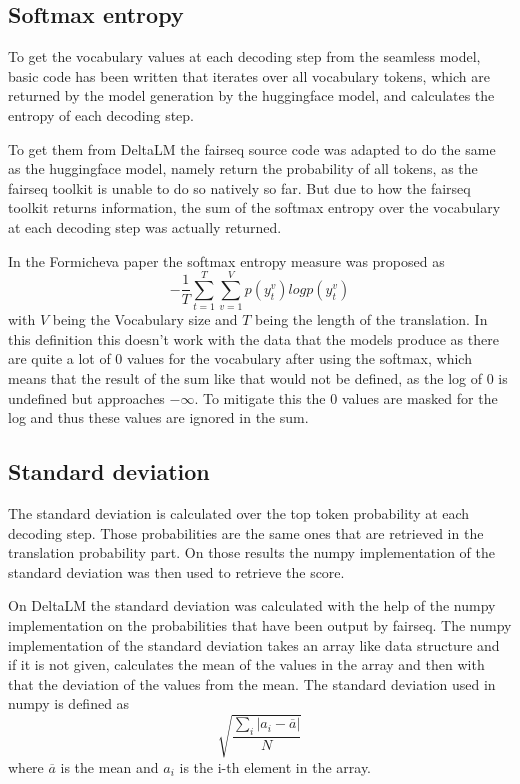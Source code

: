 \subsection{Softmax entropy}
To get the vocabulary values at each decoding step from the seamless model, basic code has been written that iterates over all vocabulary tokens, which are returned by the model generation by the huggingface model, and calculates the entropy of each decoding step.

To get them from DeltaLM the fairseq source code was adapted to do the same as the huggingface model, namely return the probability of all tokens, as the fairseq toolkit is unable to do so natively so far.
But due to how the fairseq toolkit returns information, the sum of the softmax entropy over the vocabulary at each decoding step was actually returned. 

In the Formicheva \cite{fomicheva2020unsupervised} paper the softmax entropy measure was proposed as $$-\frac{1}{T}\sum_{t=1}^T\sum_{v=1}^Vp(y_t^v)logp(y_t^v)$$ with $V$ being the Vocabulary size and $T$ being the length of the translation. In this definition this doesn't work with the data that the models produce as there are quite a lot of 0 values for the vocabulary after using the softmax, which means that the result of the sum like that would not be defined, as the log of 0 is undefined but approaches $-\infty$. To mitigate this the 0 values are masked for the log and thus these values are ignored in the sum. 

\subsection{Standard deviation }
The standard deviation is calculated over the top token probability at each decoding step. 
Those probabilities are the same ones that are retrieved in the translation probability part.
On those results the numpy implementation of the standard deviation \cite{numpystddiv} was then used to retrieve the score.

On DeltaLM the standard deviation was calculated with the help of the numpy implementation on the probabilities that have been output by fairseq. 
The numpy implementation of the standard deviation takes an array like data structure and if it is not given, calculates the mean of the values in the array and then with that the deviation of the values from the mean. 
The standard deviation used in numpy is defined as $$\sqrt{\frac{\sum_i |a_i-\overline{a}|}{N}}$$ where $\overline{a}$ is the mean and $a_i$ is the i-th element in the array.

